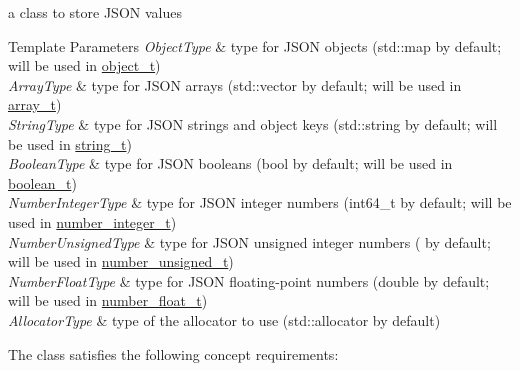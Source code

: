 a class to store J\-S\-O\-N values 


\begin{DoxyTemplParams}{Template Parameters}
{\em Object\-Type} & type for J\-S\-O\-N objects ({\ttfamily std\-::map} by default; will be used in \hyperlink{classnlohmann_1_1basic__json_a0ac9894c9de8dc551cf2e5f1c605537f}{object\-\_\-t}) \\
\hline
{\em Array\-Type} & type for J\-S\-O\-N arrays ({\ttfamily std\-::vector} by default; will be used in \hyperlink{classnlohmann_1_1basic__json_ab00b882d39306d663c23dab110f5cae0}{array\-\_\-t}) \\
\hline
{\em String\-Type} & type for J\-S\-O\-N strings and object keys ({\ttfamily std\-::string} by default; will be used in \hyperlink{classnlohmann_1_1basic__json_ab63e618bbb0371042b1bec17f5891f42}{string\-\_\-t}) \\
\hline
{\em Boolean\-Type} & type for J\-S\-O\-N booleans ({\ttfamily bool} by default; will be used in \hyperlink{classnlohmann_1_1basic__json_af3bc3e83aa162d7ba4df16a949872723}{boolean\-\_\-t}) \\
\hline
{\em Number\-Integer\-Type} & type for J\-S\-O\-N integer numbers ({\ttfamily int64\-\_\-t} by default; will be used in \hyperlink{classnlohmann_1_1basic__json_ac4b10b2364f26ce47bdb9a413ff04a59}{number\-\_\-integer\-\_\-t}) \\
\hline
{\em Number\-Unsigned\-Type} & type for J\-S\-O\-N unsigned integer numbers ({} by default; will be used in \hyperlink{classnlohmann_1_1basic__json_a60a04166c122072ab11eaf9845d9cd1d}{number\-\_\-unsigned\-\_\-t}) \\
\hline
{\em Number\-Float\-Type} & type for J\-S\-O\-N floating-\/point numbers ({\ttfamily double} by default; will be used in \hyperlink{classnlohmann_1_1basic__json_a74a0013e847fdc574b48f931f0e757e1}{number\-\_\-float\-\_\-t}) \\
\hline
{\em Allocator\-Type} & type of the allocator to use ({\ttfamily std\-::allocator} by default)\\
\hline
\end{DoxyTemplParams}
The class satisfies the following concept requirements\-:
